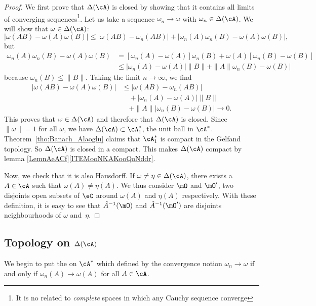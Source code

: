 \begin{proof}
	We first prove that $\Delta(\cA)$ is closed by showing that it contains all limits of converging sequences\footnote{It is no related to \emph{complete} spaces in which any Cauchy sequence converge}. Let us take a sequence $\omega_n\to\omega$ with $\omega_n\in\Delta(\cA)$. We will show that $\omega\in\Delta(\cA)$:
	\[
		| \omega(AB)-\omega(A)\omega(B) | \leq| \omega(AB)-\omega_n(AB) |+| \omega_n(A)\omega_n(B)-\omega(A)\omega(B) |,
	\]
	but
	\[
		\begin{split}
			\omega_n(A)\omega_n(B)-\omega(A)\omega(B)&=[\omega_n(A)-\omega(A)]\omega_n(B)+\omega(A)[\omega_n(B)-\omega(B)]\\
			&\leq | \omega_n(A)-\omega(A) |\| B \|+\| A \| \omega_n(B)-\omega(B) |
		\end{split}
	\]
	because $\omega_n(B)\leq \| B \|$. Taking the limit $n\to\infty$, we find
	\[
		\begin{split}
			| \omega(AB)-\omega(A)\omega(B) |&\leq| \omega(AB)-\omega_n(AB) |\\
			&\quad+| \omega_n(A)-\omega(A) |\| B \|\\
			&\quad+\| A \| |\omega_n(B)-\omega(B) |\to 0.
		\end{split}
	\]
	This proves that $\omega\in\Delta(\cA)$ and therefore that $\Delta(\cA)$ is closed. Since $\| \omega \|=1$ for all $\omega$, we have $\Delta(\cA)\subset\cA_1^*$, the unit ball in $\cA^*$. Theorem~\ref{tho:Banach_Alaoglu} claims that $\cA_1^*$ is compact in the Gelfand topology. So $\Delta(\cA)$ is closed in a compact. This makes $\Delta(\cA)$ compact by lemma \ref{LemnAeACf}\ref{ITEMooNKAKooQoNddr}.

	Now, we check that it is also Hausdorff. If $\omega\neq\eta\in\Delta(\cA)$, there exists a $A\in\cA$ such that $\omega(A)\neq\eta(A)$. We thus consider $\mO$ and $\mO'$, two disjoints open subsets of $\eC$ around $\omega(A)$ and $\eta(A)$ respectively. With these definition, it is easy to see that $\hat A^{-1}(\mO)$ and $\hat A^{-1}(\mO')$ are disjoints neighbourhoods of $\omega$ and~$\eta$.
\end{proof}


\subsection{Topology on \texorpdfstring{$\Delta(\cA)$}{DA}}\label{subsec:topo_Delta}
We begin to put the  on $\cA^*$ which defined by the convergence notion $\omega_n\to\omega$ if and only if $\omega_n(A)\to\omega(A)$ for all $A\in\cA$.

